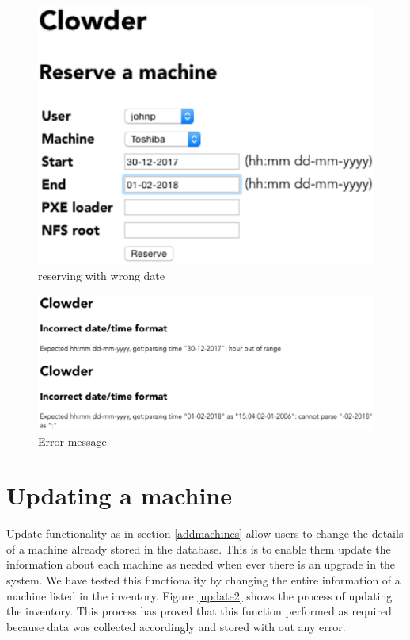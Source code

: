 \begin{figure}
\includegraphics[width=\linewidth]{dateformat1.eps}
\caption{reserving with wrong date}
\end{figure}

\begin{figure}
\includegraphics[width=\linewidth]{dateformat2.eps}
\caption{Error message}
\label{error}
\end{figure}

\pagebreak
\section*{Updating a machine}
Update functionality as in section \ref{addmachines} allow users to change the details of a machine already stored in the database. This is to enable them update the information about each machine as needed when ever there is an upgrade in the system. We have tested this functionality by changing the entire information of a machine listed in the inventory. Figure \autoref{update2} shows the process of updating the inventory. This process has proved that this function performed as required because data was collected accordingly and stored with out any error.

